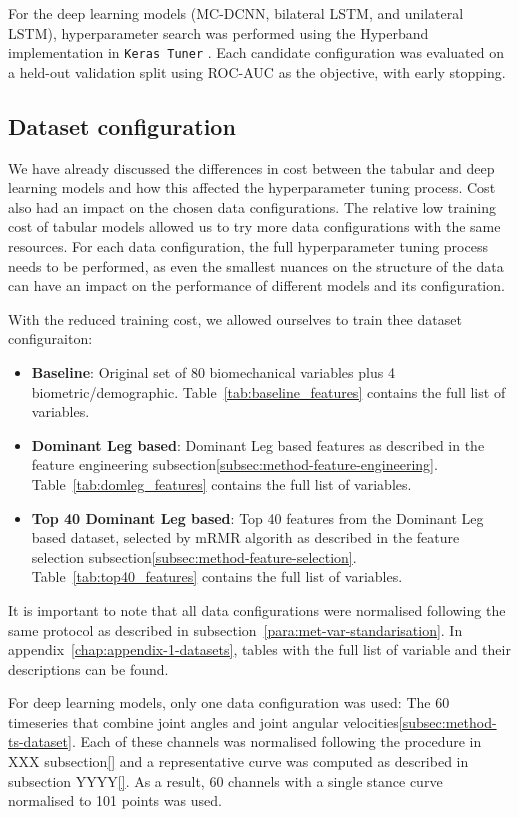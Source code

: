 For the deep learning models (MC-DCNN, bilateral LSTM, and unilateral LSTM), hyperparameter search was performed using the Hyperband implementation in \texttt{Keras Tuner} \citep{Li2018Hyperband}. Each candidate configuration was evaluated on a held-out validation split using ROC-AUC as the objective, with early stopping.

\subsection{Dataset configuration}\label{subsec:method-data-config}
We have already discussed the differences in cost between the tabular and deep learning models and how this affected the hyperparameter tuning process. Cost also had an impact on the chosen data configurations. The relative low training cost of tabular models allowed us to try more data configurations with the same resources. For each data configuration, the full hyperparameter tuning process needs to be performed, as even the smallest nuances on the structure of the data can have an impact on the performance of different models and its configuration.

With the reduced training cost, we allowed ourselves to train thee dataset configuraiton:

\begin{itemize}
    \item \textbf{Baseline}: Original set of 80 biomechanical variables plus 4 biometric/demographic. Table~\ref{tab:baseline_features} contains the full list of variables.
    \item \textbf{Dominant Leg based}: Dominant Leg based features as described in the feature engineering subsection\ref{subsec:method-feature-engineering}. Table~\ref{tab:domleg_features} contains the full list of variables.
    \item \textbf{Top 40 Dominant Leg based}: Top 40 features from the Dominant Leg based dataset, selected by mRMR algorith as described in the feature selection subsection\ref{subsec:method-feature-selection}. Table~\ref{tab:top40_features} contains the full list of variables.
\end{itemize}

It is important to note that all data configurations were normalised following the same protocol as described in subsection~\ref{para:met-var-standarisation}. In appendix~\ref{chap:appendix-1-datasets}, tables with the full list of variable and their descriptions can be found.

For deep learning models, only one data configuration was used: The 60 timeseries that combine joint angles and joint angular velocities\ref{subsec:method-ts-dataset}. Each of these \glspl{channel} was normalised following the procedure in XXX subsection\ref{} and a representative curve was computed as described in subsection YYYY\ref{}. As a result, 60 channels with a single stance curve normalised to 101 points was used.

